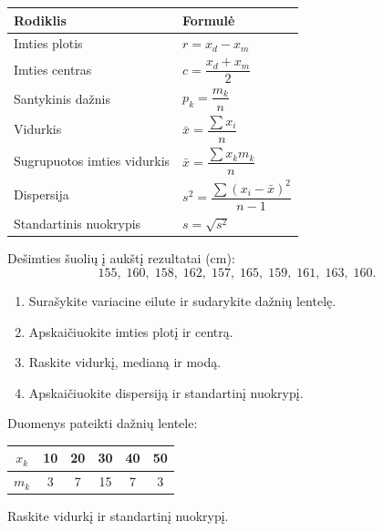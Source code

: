 \begin{center}
\begin{tabular}{|l|l|}
\hline
\textbf{Rodiklis} & \textbf{Formulė} \\
\hline
Imties plotis & $r = x_d - x_m$ \\
Imties centras & $c = \dfrac{x_d + x_m}{2}$ \\
Santykinis dažnis & $p_k = \dfrac{m_k}{n}$ \\
Vidurkis & $\bar{x} = \dfrac{\sum x_i}{n}$ \\
Sugrupuotos imties vidurkis & $\bar{x} = \dfrac{\sum x_k m_k}{n}$ \\
Dispersija & $s^2 = \dfrac{\sum(x_i-\bar{x})^2}{n-1}$ \\
Standartinis nuokrypis & $s = \sqrt{s^2}$ \\
\hline
\end{tabular}
\end{center}

\begin{exercise}
Dešimties šuolių į aukštį rezultatai (cm):
\[
  155,\; 160,\; 158,\; 162,\; 157,\; 165,\; 159,\; 161,\; 163,\; 160.
\]
\begin{enumerate}[label=\alph*)]
  \item Surašykite variacine eilute ir sudarykite dažnių lentelę.
  \item Apskaičiuokite imties plotį ir centrą.
  \item Raskite vidurkį, medianą ir modą.
  \item Apskaičiuokite dispersiją ir standartinį nuokrypį.
\end{enumerate}
\end{exercise}

\begin{exercise}
Duomenys pateikti dažnių lentele:
\begin{center}
\begin{tabular}{|c|c|c|c|c|c|}
\hline
$x_k$ & 10 & 20 & 30 & 40 & 50 \\
\hline
$m_k$ & 3  & 7  & 15 & 7  & 3  \\
\hline
\end{tabular}
\end{center}
Raskite vidurkį ir standartinį nuokrypį.
\end{exercise}

